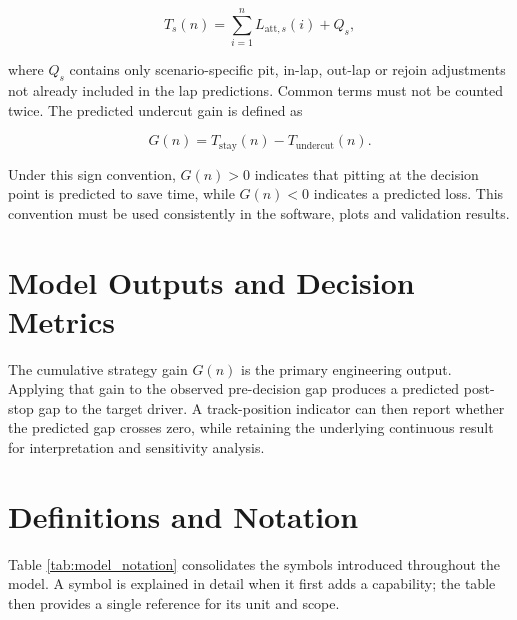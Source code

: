 \begin{equation}
T_s(n)=\sum_{i=1}^{n}L_{\mathrm{att},s}(i)+Q_s,
\label{eq:cumulative-scenario-time}
\end{equation}

where $Q_s$ contains only scenario-specific pit, in-lap, out-lap or rejoin
adjustments not already included in the lap predictions. Common terms must not
be counted twice. The predicted undercut gain is defined as

\begin{equation}
G(n)=T_{\mathrm{stay}}(n)-T_{\mathrm{undercut}}(n).
\label{eq:undercut-gain}
\end{equation}

Under this sign convention, $G(n)>0$ indicates that pitting at the decision
point is predicted to save time, while $G(n)<0$ indicates a predicted loss.
This convention must be used consistently in the software, plots and validation
results.

\section{Model Outputs and Decision Metrics}
\label{sec:model-outputs}

The cumulative strategy gain $G(n)$ is the primary engineering output. Applying
that gain to the observed pre-decision gap produces a predicted post-stop gap
to the target driver. A track-position indicator can then report whether the
predicted gap crosses zero, while retaining the underlying continuous result
for interpretation and sensitivity analysis.


\section{Definitions and Notation}
\label{subsec:notation}

Table \ref{tab:model_notation} consolidates the symbols introduced throughout
the model. A symbol is explained in detail when it first adds a capability; the
table then provides a single reference for its unit and scope.



